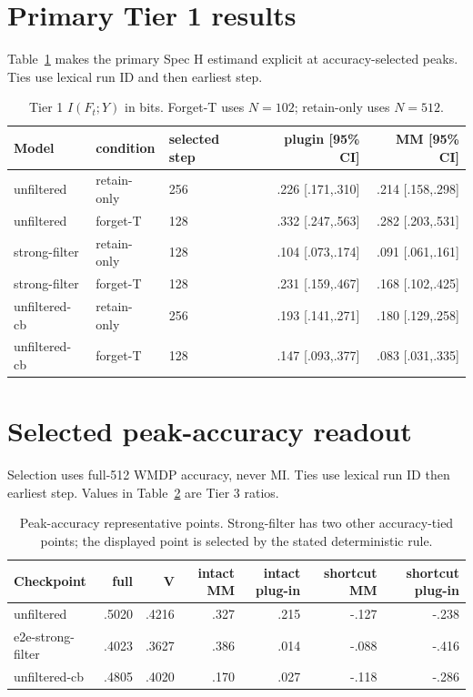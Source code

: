 \documentclass[11pt]{article}
\begin{document}
\section{Primary Tier 1 results}
Table~\ref{tab:tier1-primary} makes the primary Spec H estimand explicit at
accuracy-selected peaks.  Ties use lexical run ID and then earliest step.
\begin{table}[h]
\centering\scriptsize
\begin{tabular}{lllrr}
\toprule
Model & condition & selected step & plugin [95\% CI] & MM [95\% CI]\\
\midrule
unfiltered & retain-only & 256 & .226 [.171,.310] & .214 [.158,.298]\\
unfiltered & forget-T & 128 & .332 [.247,.563] & .282 [.203,.531]\\
strong-filter & retain-only & 128 & .104 [.073,.174] & .091 [.061,.161]\\
strong-filter & forget-T & 128 & .231 [.159,.467] & .168 [.102,.425]\\
unfiltered-cb & retain-only & 256 & .193 [.141,.271] & .180 [.129,.258]\\
unfiltered-cb & forget-T & 128 & .147 [.093,.377] & .083 [.031,.335]\\
\bottomrule
\end{tabular}
\caption{Tier 1 $I(F_t;Y)$ in bits. Forget-T uses $N=102$; retain-only uses
$N=512$.}\label{tab:tier1-primary}
\end{table}
\section{Selected peak-accuracy readout}
Selection uses full-512 WMDP accuracy, never MI.  Ties use lexical run ID then
earliest step.  Values in Table~\ref{tab:results} are Tier 3 ratios.
\begin{table}[h]
\centering
\small
\begin{tabular}{lrrrrrr}
\toprule
Checkpoint & full & V & intact MM & intact plug-in & shortcut MM & shortcut plug-in\\
\midrule
unfiltered & .5020 & .4216 & .327 & .215 & -.127 & -.238\\
e2e-strong-filter & .4023 & .3627 & .386 & .014 & -.088 & -.416\\
unfiltered-cb & .4805 & .4020 & .170 & .027 & -.118 & -.286\\
\bottomrule
\end{tabular}
\caption{Peak-accuracy representative points.  Strong-filter has two other
accuracy-tied points; the displayed point is selected by the stated
deterministic rule.}\label{tab:results}
\end{table}
\end{document}

